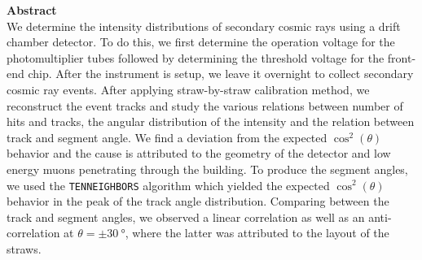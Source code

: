 \documentclass[a4paper]{report}
\numberwithin{equation}{section}
\begin{document}
\begin{titlepage}
	\vspace*{5em}

	\begin{minipage}{0.8\textwidth}
		\begin{centering}
			\textbf{Abstract}\\[0.2cm]
            We determine the intensity distributions of secondary cosmic rays using a drift chamber detector.
			 To do this, we first determine the operation voltage for the photomultiplier tubes followed 
			 by determining the threshold voltage for the front-end chip. After the instrument is setup, we 
			 leave it overnight to collect secondary cosmic ray events. After applying straw-by-straw calibration method,
			  we reconstruct the event tracks and study the various relations between number of hits and tracks, the angular
			   distribution of the intensity and the relation between track and segment angle. We find a 
			   deviation from the expected $\cos^2(\theta)$ behavior and the cause is attributed to the geometry of the detector 
			   and low energy muons penetrating through the building. To produce the segment angles, we used the \texttt{TENNEIGHBORS}
			   algorithm which yielded the expected $\cos^2(\theta)$ behavior in the peak of the track angle distribution. 
			   Comparing between the track and segment angles, we observed a linear correlation as well as an anti-correlation at 
			   $\theta = \pm \SI{30}{\degree}$, where the latter was attributed to the layout of the straws. 
		\end{centering}
	\end{minipage}
	
	
	
	
	
	
	 
	
	
\end{titlepage}
\end{document}
